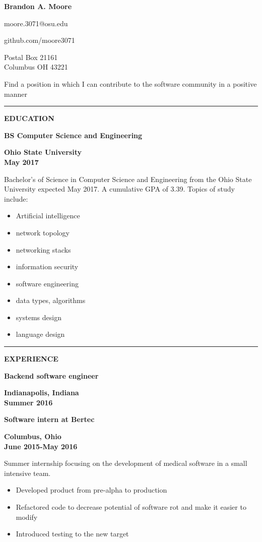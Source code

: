 \documentclass[letterpaper,10pt]{article}
\newcommand{\topic}[1]{\vspace{2mm} \rule[.5em]{10mm}{.2pt} {\large \bfseries #1} \xrfill[.5em]{.2pt} \newline}
\newcommand{\fullentry}[3] { \parbox[t]{.6\textwidth}{\large \bfseries #1} \hfill \parbox[t]{.4\textwidth}{\bfseries \raggedleft #2 \\ #3} \newline}
\newcommand{\contact}[1]{\parbox{.2\textwidth}{\centering #1}}
\begin{document}
	\begin{center} \huge \bfseries
		Brandon A. Moore
	\end{center}
	\contact{moore.3071@osu.edu} \hfill \contact{github.com/moore3071} \hfill \contact{Postal Box 21161\\ Columbus OH 43221}


	\vspace{5mm}

	 Find a position in which I can contribute to the software community in a positive manner

	\vspace{3mm}

	\topic{EDUCATION}

		\fullentry{BS Computer Science and Engineering}{Ohio State University}{May 2017}
			Bachelor's of Science in Computer Science and Engineering from the Ohio State University expected May 2017. A cumulative GPA of 3.39. Topics of study include:
			\begin{multicols}{4}
				\begin{itemize}
					\setlength\itemsep{.1mm}
					\item Artificial intelligence
					\item network topology
					\item networking stacks
					\item information security
					\item software engineering
					\item data types, algorithms
					\item systems design
					\item language design
				\end{itemize}
			\end{multicols}

	\topic{EXPERIENCE}

		\fullentry{Backend software engineer}{Indianapolis, Indiana}{Summer 2016}

		\fullentry{Software intern at Bertec}{Columbus, Ohio}{June 2015-May 2016}
			Summer internship focusing on the development of medical software in a small intensive team.
			\begin{itemize}
				\item Developed product from pre-alpha to production
				\item Refactored code to decrease potential of software rot and make it easier to modify
				\item Introduced testing to the new target
			\end{itemize}
	
\end{document}

